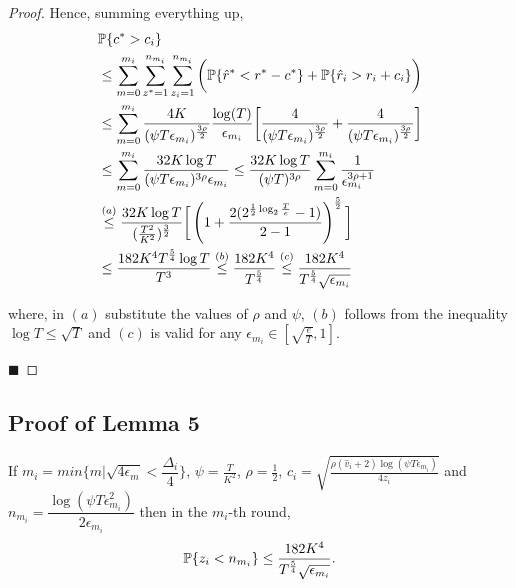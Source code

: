 \begin{proof}
Hence, summing everything up, 
\begin{align*}
&\mathbb{P}\lbrace c^{*} > c_i \rbrace \\
&\leq \sum_{m=0}^{m_i}\sum_{z^* =1}^{n_{m_i}}\sum_{z_i =1}^{n_{m_i}}\bigg(\mathbb{P}\lbrace \hat{r}^* < r^* - c^{*}\rbrace + \mathbb{P}\lbrace \hat{r}_i > r_i + c_i\rbrace\bigg)\\
&\leq \sum_{m=0}^{m_i}\dfrac{4K}{(\psi T \epsilon_{m_i})^{\frac{3\rho}{2}}}\dfrac{\log(T)}{\epsilon_{m_i}}\bigg[\frac{4}{(\psi T\epsilon_{m_i})^{\frac{3\rho}{2}}} + \frac{4}{(\psi T\epsilon_{m_i})^{\frac{3\rho}{2}}}  \bigg]\\
&\leq \sum_{m=0}^{m_i}\dfrac{32K\log T}{(\psi T\epsilon_{m_i})^{3\rho}\epsilon_{m_i}} \leq 
\dfrac{32K\log T}{(\psi T)^{3\rho}}\sum_{m=0}^{m_i}\dfrac{1}{\epsilon_{m_i}^{3\rho + 1}} \\
&\overset{(a)}{\leq} 
\dfrac{32 K\log T}{(\frac{T^2}{K^2})^{\frac{3}{2}}}\bigg[\left( 1 + \dfrac{2(2^{ \frac{1}{2}\log_{2} \frac{T}{e}}-1)}{2-1} \right)^{\frac{5}{2}}\bigg] \\
&\leq \dfrac{182 K^4 T^{\frac{5}{4}}\log T}{T^3} \overset{(b)}{\leq} \dfrac{182 K^4}{T^{\frac{5}{4}}} \overset{(c)}{\leq} \dfrac{182 K^4}{T^{\frac{5}{4}}\sqrt{\epsilon_{m_i}}}
\end{align*}

where, in $(a)$ substitute the values of $\rho$ and $\psi$, $(b)$ follows from the inequality $\log T \leq \sqrt{T}$ and $(c)$ is valid for any $\epsilon_{m_i}\in[\sqrt{\frac{e}{T}},1]$. 

\hfill $\blacksquare$	
\end{proof}


\subsection{Proof of Lemma 5}
\label{App:Lemma:5}
\begin{lemma}
If $m_i = min\lbrace m|\sqrt{4\epsilon_{m} } < \dfrac{\Delta_i}{4} \rbrace $, $\psi=\frac{T}{ K^2}$, $\rho=\frac{1}{2}$, $c_{i} =\sqrt{\frac{\rho (\hat{v}_i + 2)\log (\psi T\epsilon_{m_{i}})}{4 z_i}}$ and $n_{m_i}=\dfrac{\log{(\psi T\epsilon_{m_{i}}^{2})}}{2\epsilon_{m_{i}}}$ then in the $m_i$-th round, 
\begin{align*}
\mathbb{P}\lbrace z_i < n_{m_i} \rbrace \leq \dfrac{182 K^4}{T^{\frac{5}{4}}\sqrt{\epsilon_{m_i}}}.
\end{align*}
\end{lemma}

